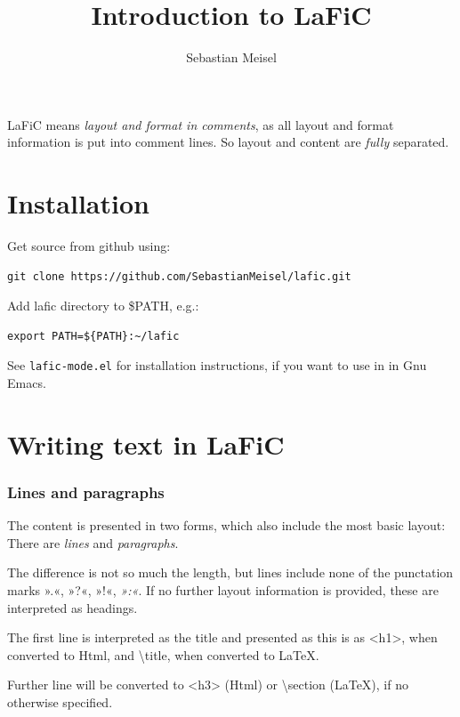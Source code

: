 \documentclass{article}
\title{Introduction to LaFiC}
\author{Sebastian Meisel}
\begin{document}
\maketitle


LaFiC means \textit{layout and format in comments}, as all layout and
format information is put into comment lines. So layout and
content are \emph{fully} separated.

\part{Installation}

Get source from github using:

\begin{verbatim}
git clone https://github.com/SebastianMeisel/lafic.git

\end{verbatim}

Add lafic directory to \$PATH, e.g.:

\begin{verbatim}
export PATH=${PATH}:~/lafic

\end{verbatim}

See \texttt{lafic-mode.el} for installation instructions, if you want
to use in in Gnu Emacs.

\part{Writing text in LaFiC}

\section{Lines and paragraphs}

The content is presented in two forms, which also include
the most basic layout: There are \emph{lines} and \emph{paragraphs}.

The difference is not so much the length, but lines include
none of the punctation marks ».«, »?«, »!«, \emph{»:«}. If no
further layout information is provided, these are
interpreted as headings.

The first line is interpreted as the title and presented as
this is as <h1>, when converted to Html, and \textbackslash title, when 
converted to \LaTeX.

Further line will be converted to <h3> (Html) or \textbackslash section
(\LaTeX), if no otherwise specified.
\end{document}
